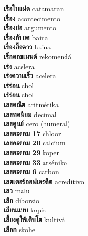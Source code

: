 \textbf{ เรือใบแฝด  } catamaran \\
\textbf{ เรื่อง  } acontecimento \\
\textbf{ เรื่องย่อ  } argumento \\
\textbf{ เรื่องอัปยศ  } baina \\
\textbf{ เรื่องอื้อฉาว  } baina \\
\textbf{ เร็กคอมเมนด์  } rekomendá \\
\textbf{ เร่ง  } acelera \\
\textbf{ เร่งความเร็ว  } acelera \\
\textbf{ เร่ร่อน  } chol \\
\textbf{ เร่่ร่อน  } chol \\
\textbf{ เลขคณิต  } aritmétika \\
\textbf{ เลขทศนิยม  } decimal \\
\textbf{ เลขศูนย์  } cero (numeral) \\
\textbf{ เลขอะตอม 17  } chloor \\
\textbf{ เลขอะตอม 20  } calcium \\
\textbf{ เลขอะตอม 29  } koper \\
\textbf{ เลขอะตอม 33  } arséniko \\
\textbf{ เลขอะตอม 6  } carbon \\
\textbf{ เลตเตอร์ออฟเครดิต  } acreditivo \\
\textbf{ เลว  } malu \\
\textbf{ เลิก  } diborsio \\
\textbf{ เลียนแบบ  } kopia \\
\textbf{ เลี้ยงดูให้เติบโต  } kultivá \\
\textbf{ เลือก  } skohe \\
